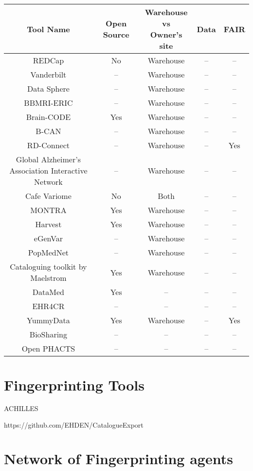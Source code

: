 \begin{tabular}{ | c | c | c | c | c | }
\hline 
Tool Name & Open Source & \makecell{Warehouse \\ vs \\ Owner's site}  & Data & FAIR\\
\hline
REDCap \cite{redcap} & No & Warehouse & -- & -- \\
\hline
Vanderbilt \cite{vanderbilt} & -- & Warehouse & -- & -- \\
\hline
Data Sphere \cite{datasphere} & -- & Warehouse & -- & -- \\
\hline
BBMRI-ERIC \cite{bbmrieric} & -- & Warehouse & -- & -- \\
\hline
Brain-CODE \cite{braincode} & Yes & Warehouse & -- & -- \\
\hline
B-CAN \cite{bcan} & -- & Warehouse & -- & -- \\
\hline
RD-Connect \cite{rdconnect} & -- & Warehouse & -- & Yes \\
\hline
\makecell{Global Alzheimer's \\Association Interactive\\ Network} \cite{gaain} & -- & Warehouse & -- & -- \\
\hline
Cafe Variome \cite{cafevariome} & No & Both & -- & -- \\
\hline
MONTRA \cite{montra} & Yes & Warehouse & -- & -- \\
\hline
Harvest \cite{harvest} & Yes & Warehouse & -- & -- \\
\hline
eGenVar \cite{egenvar} & -- & Warehouse & -- & -- \\
\hline
PopMedNet \cite{popmednet} & -- & Warehouse & -- & -- \\
\hline
Cataloguing toolkit by Maelstrom \cite{maelstrom} & Yes & Warehouse & -- & -- \\
\hline
DataMed \cite{datamed} & Yes & -- & -- & -- \\
\hline
EHR4CR \cite{ehr4cr} & -- & -- & -- & -- \\
\hline
YummyData \cite{yummydata} & Yes & Warehouse & -- & Yes \\
\hline
BioSharing \cite{biosharing} & -- & -- & -- & -- \\
\hline
Open PHACTS \cite{phacts} & -- & -- & -- & -- \\
\hline
\end{tabular}

\section{Fingerprinting Tools}

ACHILLES

https://github.com/EHDEN/CatalogueExport

\section{Network of Fingerprinting agents}
